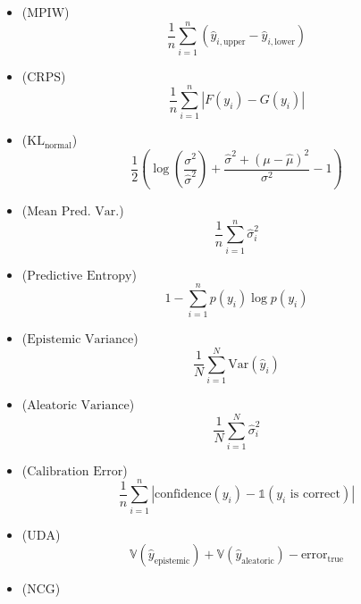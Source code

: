 \begin{formelsammlung}
\begin{mdframed}[style=exercise]
\begin{itemize}[label={},left=0pt]
      \item {} (\( \text{MPIW} \)) 
      {\scriptsize \[
          \frac{1}{n} \sum_{i=1}^{n} (\hat{y}_{i,\text{upper}} - \hat{y}_{i,\text{lower}})
      \]} \vspace{-1.5em}
      \item {} (\( \text{CRPS} \)) 
      {\scriptsize \[
          \frac{1}{n} \sum_{i=1}^{n} \left| F(y_i) - G(y_i) \right|
      \]} \vspace{-1.5em}
      \item {} (\( \text{KL}_{\text{normal}} \)) 
      {\scriptsize \[
          \frac{1}{2} \left( \log\left(\frac{\sigma^2}{\hat{\sigma}^2}\right) + \frac{\hat{\sigma}^2 + (\mu - \hat{\mu})^2}{\sigma^2} - 1 \right)
      \]} \vspace{-1.5em}
      \item {} (\( \text{Mean Pred. Var.} \)) 
      {\scriptsize \[
          \frac{1}{n} \sum_{i=1}^{n} \hat{\sigma}_i^2
      \]} \vspace{-1.5em}
      \item {} (\( \text{Predictive Entropy} \)) 
      {\scriptsize \[
          1 - \sum_{i=1}^{n} p(y_i) \log p(y_i)
      \]} \vspace{-1.5em}
      \item {} (\( \text{Epistemic Variance} \)) 
      {\scriptsize \[
          \frac{1}{N} \sum_{i=1}^{N} \text{Var}(\hat{y}_i)
      \]} \vspace{-1.5em}
      \item {} (\( \text{Aleatoric Variance} \)) 
      {\scriptsize \[
          \frac{1}{N} \sum_{i=1}^{N} \hat{\sigma}_i^2
      \]} \vspace{-1.5em}
      \item {} (\( \text{Calibration Error} \)) 
      {\scriptsize \[
          \frac{1}{n} \sum_{i=1}^{n} \left| \text{confidence}(y_i) - \mathbb{1}(y_i \text{ is correct}) \right|
      \]} \vspace{-1.5em}
      \item {} (\( \text{UDA} \)) 
      {\scriptsize \[
          \mathbb{V}(\hat{y}_{\text{epistemic}}) + \mathbb{V}(\hat{y}_{\text{aleatoric}}) - \text{error}_{\text{true}}
      \]} \vspace{-1.5em}
      \item {} (\( \text{NCG} \)) 

\end{itemize}
\end{mdframed}
\end{formelsammlung}
